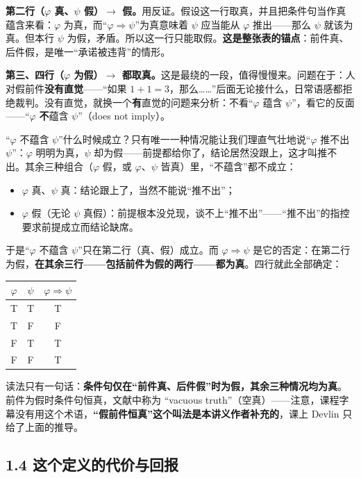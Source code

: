 \documentclass[UTF8,a4paper,11pt]{ctexart}
\begin{document}
\textbf{第二行（$\varphi$ 真、$\psi$ 假）$\rightarrow$ 假。}用反证。假设这一行取真，并且把条件句当作真蕴含来看：$\varphi$ 为真，而“$\varphi \Rightarrow \psi$”为真意味着 $\psi$ 应当能从 $\varphi$ 推出——那么 $\psi$ 就该为真。但本行 $\psi$ 为假，矛盾。所以这一行只能取假。\textbf{这是整张表的锚点}：前件真、后件假，是唯一“承诺被违背”的情形。

\textbf{第三、四行（$\varphi$ 为假）$\rightarrow$ 都取真。}这是最绕的一段，值得慢慢来。问题在于：人对假前件\textbf{没有直觉}——“如果 $1+1=3$，那么……”后面无论接什么，日常语感都拒绝裁判。没有直觉，就换一个\textbf{有}直觉的问题来分析：不看“$\varphi$ 蕴含 $\psi$”，看它的反面——“$\varphi$ \textbf{不}蕴含 $\psi$”（does not imply）。

“$\varphi$ 不蕴含 $\psi$”什么时候成立？只有唯一一种情况能让我们理直气壮地说“$\varphi$ 推不出 $\psi$”：$\varphi$ 明明为真，$\psi$ 却为假——前提都给你了，结论居然没跟上，这才叫推不出。其余三种组合（$\varphi$ 假，或 $\varphi$、$\psi$ 皆真）里，“不蕴含”都不成立：

\begin{itemize}
  \item $\varphi$ 真、$\psi$ 真：结论跟上了，当然不能说“推不出”；
  \item $\varphi$ 假（无论 $\psi$ 真假）：前提根本没兑现，谈不上“推不出”——“推不出”的指控要求前提成立而结论缺席。
\end{itemize}

于是“$\varphi$ 不蕴含 $\psi$”只在第二行（真、假）成立。而 $\varphi \Rightarrow \psi$ 是它的否定：在第二行为假，\textbf{在其余三行——包括前件为假的两行——都为真}。四行就此全部确定：

\begin{center}
\begin{tabular}{cc|c}
\toprule
$\varphi$ & $\psi$ & $\varphi \Rightarrow \psi$ \\
\midrule
T & T & T \\
T & F & F \\
F & T & T \\
F & F & T \\
\bottomrule
\end{tabular}
\end{center}

读法只有一句话：\textbf{条件句仅在“前件真、后件假”时为假，其余三种情况均为真}。前件为假时条件句恒真，文献中称为 “vacuous truth”（空真）——注意，课程字幕没有用这个术语，\textbf{“假前件恒真”这个叫法是本讲义作者补充的}，课上 Devlin 只给了上面的推导。

\subsection*{1.4 这个定义的代价与回报}
\end{document}
